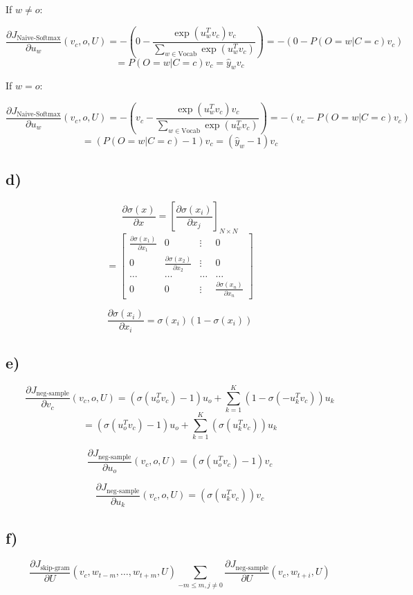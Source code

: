 \documentclass[12pt]{article}
\begin{document}
If $w \neq o$:

\[
\frac{\partial J_{\text{Naive-Softmax}}}{\partial u_w} (v_c, o, U)
= - (0 -  \frac{\exp (u_w^T v_c)  v_c}{\sum_{w \in \text{Vocab}}  \exp (u_w^T v_c)})
= - (0 - P(O=w|C=c) v_c)
\]
\[
= P(O=w|C=c) v_c
= \hat{y}_w v_c
\]

If $w = o$:

\[
\frac{\partial J_{\text{Naive-Softmax}}}{\partial u_w} (v_c, o, U)
= - (v_c -  \frac{\exp (u_w^T v_c)  v_c}{\sum_{w \in \text{Vocab}}  \exp (u_w^T v_c)})
= - (v_c - P(O=w|C=c) v_c)
\]
\[
= (P(O=w|C=c) - 1) v_c
= (\hat{y}_w - 1) v_c
\]

\subsection*{d) }

\[
\frac{\partial \sigma(x)}{\partial x} = [\frac{\partial \sigma(x_i)}{\partial x_j}]_{N \times N}
\]
\[
= \begin{bmatrix}
\frac{\partial \sigma(x_1)}{\partial x_1} & 0 & \vdots & 0\\
0 & \frac{\partial \sigma(x_2)}{\partial x_2} & \vdots & 0\\
\ldots & \ldots & \ldots & \ldots\\
0 & 0 & \vdots & \frac{\partial \sigma(x_n)}{\partial x_n}
\end{bmatrix}
\]

\[
\frac{\partial \sigma(x_i)}{\partial x_i} = \sigma(x_i) (1-\sigma(x_i))
\]

\subsection*{e) }

\[
\frac{\partial J_{\text{neg-sample}}}{\partial v_c} (v_c, o, U) 
= (\sigma(u_o^T v_c) - 1) u_o + \sum_{k=1}^K (1-\sigma(-u_k^T v_c)) u_k
\]
\[
= (\sigma(u_o^T v_c) - 1) u_o + \sum_{k=1}^K (\sigma(u_k^T v_c)) u_k
\]

\[
\frac{\partial J_{\text{neg-sample}}}{\partial u_o} (v_c, o, U) 
= (\sigma(u_o^T v_c) - 1) v_c
\]

\[
\frac{\partial J_{\text{neg-sample}}}{\partial u_k} (v_c, o, U) 
= (\sigma(u_k^T v_c)) v_c
\]

\subsection*{f) }

\[
\frac{\partial J_{\text{skip-gram}}}{\partial U} (v_c, w_{t-m}, \ldots, w_{t+m}, U) 
\sum_{-m \leq m, j \neq 0} \frac{\partial J_{\text{neg-sample}}}{\partial U} (v_c, w_{t+i}, U)
\]
\end{document}
